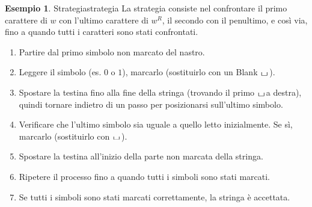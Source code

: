 \documentclass[a4paper]{article}
\theoremstyle{definition} %
\newtheorem{example}{Esempio}
\newcommand{\blankS}{\ensuremath{\raisebox{-0.15ex}{\scalebox{1.3}[0.7]{$\sqcup$}}\mkern2mu}}
\begin{document}
\begin{example}{Strategia}{strategia}
La strategia consiste nel confrontare il primo carattere di $w$ con l'ultimo carattere di $w^R$, il secondo con il penultimo, e così via, fino a quando tutti i caratteri sono stati confrontati.
\begin{enumerate}
    \item Partire dal primo simbolo non marcato del nastro.
    \item Leggere il simbolo (es. $0$ o $1$), marcarlo (sostituirlo con un Blank $\blankS$).
    \item Spostare la testina fino alla fine della stringa (trovando il primo \blankS a destra), quindi tornare indietro di un passo per posizionarsi sull'ultimo simbolo.
    \item Verificare che l'ultimo simbolo sia uguale a quello letto inizialmente. Se sì, marcarlo (sostituirlo con \blankS).
    \item Spostare la testina all'inizio della parte non marcata della stringa.
    \item Ripetere il processo fino a quando tutti i simboli sono stati marcati.
    \item Se tutti i simboli sono stati marcati correttamente, la stringa è accettata.
\end{enumerate}
\end{example}

\end{document}
